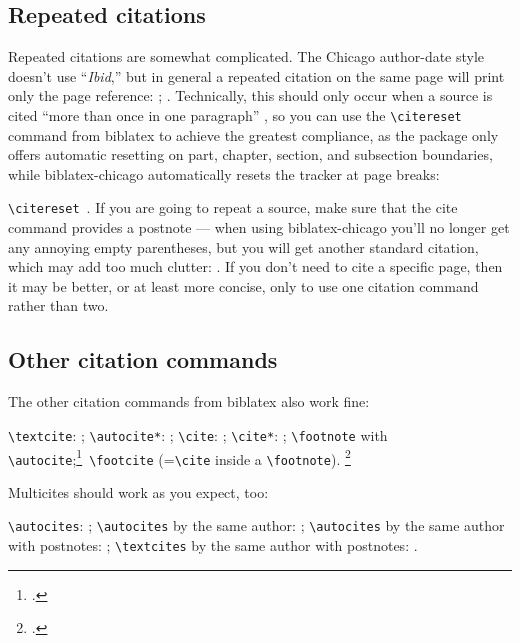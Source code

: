 \documentclass[a4paper,12pt]{report}
\newcommand{\cmd}[1]{\texttt{\textbackslash #1}}
\begin{document}
\subsection*{Repeated citations}
\label{sec:ibidem}

Repeated citations are somewhat complicated.  The Chicago author-date
style doesn't use \enquote{\emph{Ibid},} but in general a repeated
citation on the same page will print only the page reference:
\autocite{browning:aurora}; \autocite[45]{browning:aurora}.
Technically, this should only occur when a source is cited
\enquote{more than once in one paragraph}
\autocite[15.26]{chicago:manual}, so you can use the \cmd{citereset}
command from \textsf{biblatex} to achieve the greatest compliance, as
the package only offers automatic resetting on part, chapter, section,
and subsection boundaries, while \textsf{biblatex-chicago}
automatically resets the tracker at page breaks:

\citereset\cmd{citereset}\ \autocite[15.27]{chicago:manual}.  If you
are going to repeat a source, make sure that the cite command provides
a postnote --- when using \textsf{biblatex-chicago} you'll no longer
get any annoying empty parentheses, but you will get another standard
citation, which may add too much clutter: \autocite{chicago:manual}.
If you don't need to cite a specific page, then it may be better, or
at least more concise, only to use one citation command rather than
two.

\subsection*{Other citation commands}
\label{sec:other}

The other citation commands from \textsf{biblatex} also work fine:

\cmd{textcite}: \textcite{conley:fifthgrade}; \cmd{autocite*}:
\autocite*{connell:chronic}; \cmd{cite}: \cite{conway:evolution};
\cmd{cite*}: \cite*{davenport:attention}; \cmd{foot\-note} with
\cmd{autocite};\footnote{\autocite{donne:var:15}.}\ \cmd{footcite}
(=\cmd{cite} inside a \cmd{footnote}).  \footcite{dunn:revolutions}

Multicites should work as you expect, too:

\cmd{autocites}: \autocites{dyna:browser}{eliot:pound};
\cmd{autocites} by the same author:
\autocites{pirumova}{pirumova:russian}; \cmd{autocites} by the same
author with postnotes: \autocites{pirumova}[14]{pirumova:russian};
\cmd{textcites} by the same author with postnotes:
\textcites[37]{pirumova}{pirumova:russian}.
\end{document}

